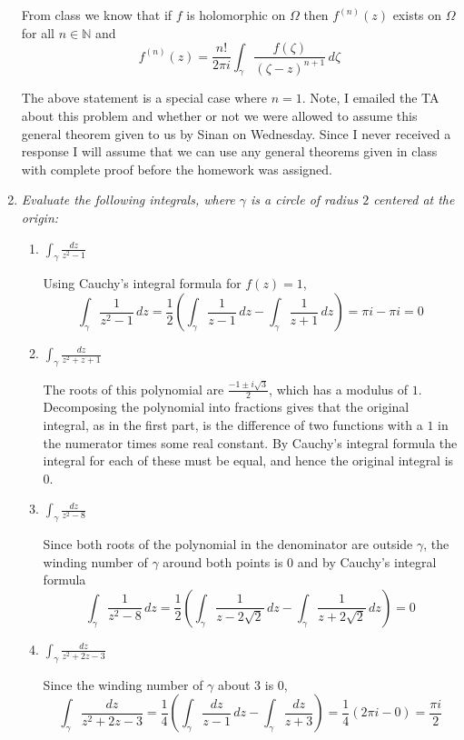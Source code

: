 \documentclass[letterpaper, 11pt]{article}
\begin{document}
\begin{enumerate}
From class we know that if $f$ is holomorphic on $\Omega$ then $f^{(n)}(z)$ exists on $\Omega$ for all $n \in \mathbb{N}$ and
\[
f^{(n)}(z) = \frac{n!}{2\pi i} \int_{\gamma} \frac{f(\zeta)}{(\zeta - z)^{n+1}} \,d\zeta
\]

The above statement is a special case where $n=1$.  Note, I emailed the TA about this problem and whether or not we were allowed to assume this general theorem given to us by Sinan on Wednesday.  Since I never received a response I will assume that we can use any general theorems given in class with complete proof before the homework was assigned.

\item \emph{Evaluate the following integrals, where $\gamma$ is a circle of radius $2$ centered at the origin:}
\begin{enumerate}
\item \emph{$\int_{\gamma} \frac{dz}{z^2-1}$}

Using Cauchy's integral formula for $f(z)=1$, $$\int_{\gamma}\frac{1}{z^2 - 1} \,dz = \frac{1}{2}\left(\int_{\gamma}\frac{1}{z-1}\,dz - \int_{\gamma}\frac{1}{z+1} \,dz\right) = \pi i - \pi i = 0$$
\item \emph{$\int_{\gamma} \frac{dz}{z^2+z+1}$}

The roots of this polynomial are $\frac{-1 \pm i\sqrt{3}}{2}$, which has a modulus of $1$.  Decomposing the polynomial into fractions gives that the original integral, as in the first part, is the difference of two functions with a $1$ in the numerator times some real constant.  By Cauchy's integral formula the integral for each of these must be equal, and hence the original integral is $0$.

\item \emph{$\int_{\gamma} \frac{dz}{z^2-8}$}

Since both roots of the polynomial in the denominator are outside $\gamma$, the winding number of $\gamma$ around both points is $0$ and by Cauchy's integral formula $$\int_{\gamma}\frac{1}{z^2 - 8} \,dz = \frac{1}{2}\left(\int_{\gamma}\frac{1}{z-2\sqrt{2}}\,dz - \int_{\gamma}\frac{1}{z+2\sqrt{2}} \,dz\right) = 0$$

\item \emph{$\int_{\gamma} \frac{dz}{z^2+2z-3}$}

Since the winding number of $\gamma$ about $3$ is $0$,
\[
\int_{\gamma} \frac{dz}{z^2+2z-3} = \frac{1}{4}\left(\int_{\gamma} \frac{dz}{z-1} \,dz - \int_{\gamma} \frac{dz}{z+3}\right) = \frac{1}{4}(2\pi i - 0) = \frac{\pi i}{2}
\]
\end{enumerate}


\end{enumerate}
\end{document}
